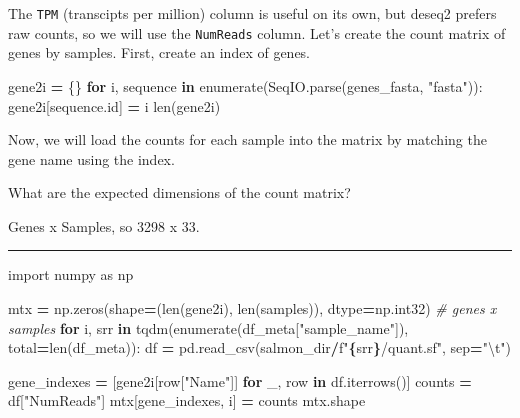 \documentclass[
]{book}
\newenvironment{Shaded}{\begin{snugshade}}{\end{snugshade}}
\newcommand{\BuiltInTok}[1]{#1}
\newcommand{\CharTok}[1]{\textcolor[rgb]{0.31,0.60,0.02}{#1}}
\newcommand{\CommentTok}[1]{\textcolor[rgb]{0.56,0.35,0.01}{\textit{#1}}}
\newcommand{\ControlFlowTok}[1]{\textcolor[rgb]{0.13,0.29,0.53}{\textbf{#1}}}
\newcommand{\ImportTok}[1]{#1}
\newcommand{\KeywordTok}[1]{\textcolor[rgb]{0.13,0.29,0.53}{\textbf{#1}}}
\newcommand{\NormalTok}[1]{#1}
\newcommand{\OperatorTok}[1]{\textcolor[rgb]{0.81,0.36,0.00}{\textbf{#1}}}
\newcommand{\SpecialCharTok}[1]{\textcolor[rgb]{0.81,0.36,0.00}{\textbf{#1}}}
\newcommand{\SpecialStringTok}[1]{\textcolor[rgb]{0.31,0.60,0.02}{#1}}
\newcommand{\StringTok}[1]{\textcolor[rgb]{0.31,0.60,0.02}{#1}}
\begin{document}
The \texttt{TPM} (transcipts per million) column is useful on its own, but deseq2 prefers raw counts, so we will use the \texttt{NumReads} column.
Let's create the count matrix of genes by samples. First, create an index of genes.

\begin{Shaded}
\begin{Highlighting}[numbers=left,,]
\NormalTok{gene2i }\OperatorTok{=}\NormalTok{ \{\}}
\ControlFlowTok{for}\NormalTok{ i, sequence }\KeywordTok{in} \BuiltInTok{enumerate}\NormalTok{(SeqIO.parse(genes\_fasta, }\StringTok{"fasta"}\NormalTok{)):}
\NormalTok{    gene2i[sequence.}\BuiltInTok{id}\NormalTok{] }\OperatorTok{=}\NormalTok{ i}
\BuiltInTok{len}\NormalTok{(gene2i)}
\end{Highlighting}
\end{Shaded}

Now, we will load the counts for each sample into the matrix by matching the gene name using the index.

What are the expected dimensions of the count matrix?

Genes x Samples, so 3298 x 33.

\begin{center}\rule{0.5\linewidth}{0.5pt}\end{center}

\begin{Shaded}
\begin{Highlighting}[numbers=left,,]
\ImportTok{import}\NormalTok{ numpy }\ImportTok{as}\NormalTok{ np}

\NormalTok{mtx }\OperatorTok{=}\NormalTok{ np.zeros(shape}\OperatorTok{=}\NormalTok{(}\BuiltInTok{len}\NormalTok{(gene2i), }\BuiltInTok{len}\NormalTok{(samples)), dtype}\OperatorTok{=}\NormalTok{np.int32) }\CommentTok{\# genes x samples}
\ControlFlowTok{for}\NormalTok{ i, srr }\KeywordTok{in}\NormalTok{ tqdm(}\BuiltInTok{enumerate}\NormalTok{(df\_meta[}\StringTok{"sample\_name"}\NormalTok{]), total}\OperatorTok{=}\BuiltInTok{len}\NormalTok{(df\_meta)):}
\NormalTok{    df }\OperatorTok{=}\NormalTok{ pd.read\_csv(salmon\_dir}\OperatorTok{/}\SpecialStringTok{f"}\SpecialCharTok{\{}\NormalTok{srr}\SpecialCharTok{\}}\SpecialStringTok{/quant.sf"}\NormalTok{, sep}\OperatorTok{=}\StringTok{"}\CharTok{\textbackslash{}t}\StringTok{"}\NormalTok{)}

\NormalTok{    gene\_indexes }\OperatorTok{=}\NormalTok{ [gene2i[row[}\StringTok{"Name"}\NormalTok{]] }\ControlFlowTok{for}\NormalTok{ \_, row }\KeywordTok{in}\NormalTok{ df.iterrows()]}
\NormalTok{    counts }\OperatorTok{=}\NormalTok{ df[}\StringTok{"NumReads"}\NormalTok{]}
\NormalTok{    mtx[gene\_indexes, i] }\OperatorTok{=}\NormalTok{ counts}
\NormalTok{mtx.shape}
\end{Highlighting}
\end{Shaded}
\end{document}
